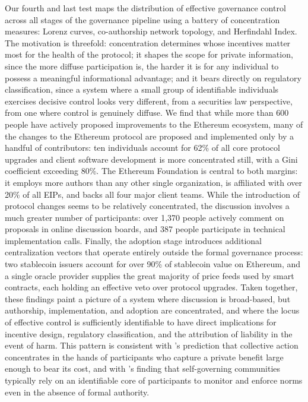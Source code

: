 \documentclass[No]{AEA}
\begin{document}
Our fourth and last test maps the distribution of effective governance control across all stages of the governance pipeline using a battery of concentration measures: Lorenz curves, co-authorship network topology, and Herfindahl Index. The motivation is threefold: concentration determines whose incentives matter most for the health of the protocol; it shapes the scope for private information, since the more diffuse participation is, the harder it is for any individual to possess a meaningful informational advantage; and it bears directly on regulatory classification, since a system where a small group of identifiable individuals exercises decisive control looks very different, from a securities law perspective, from one where control is genuinely diffuse. We find that while more than 600 people have actively proposed improvements to the Ethereum ecosystem, many of the changes to the Ethereum protocol are proposed and implemented only by a handful of contributors: ten individuals account for 62\% of all core protocol upgrades and client software development is more concentrated still, with a Gini coefficient exceeding 80\%. The Ethereum Foundation is central to both margins: it employs more authors than any other single organization, is affiliated with over 20\% of all EIPs, and backs all four major client teams. While the introduction of protocol changes seems to be relatively concentrated, the discussion involves a much greater number of participants: over 1,370 people actively comment on proposals in online discussion boards, and 387 people participate in technical implementation calls. Finally, the adoption stage introduces additional centralization vectors that operate entirely outside the formal governance process: two stablecoin issuers account for over 90\% of stablecoin value on Ethereum, and a single oracle provider supplies the great majority of price feeds used by smart contracts, each holding an effective veto over protocol upgrades. Taken together, these findings paint a picture of a system where discussion is broad-based, but authorship, implementation, and adoption are concentrated, and where the locus of effective control is sufficiently identifiable to have direct implications for incentive design, regulatory classification, and the attribution of liability in the event of harm. This pattern is consistent with \cite{Olson1965}'s prediction that collective action concentrates in the hands of participants who capture a private benefit large enough to bear its cost, and with \cite{Ostrom1990}'s finding that self-governing communities typically rely on an identifiable core of participants to monitor and enforce norms even in the absence of formal authority.
\end{document}

